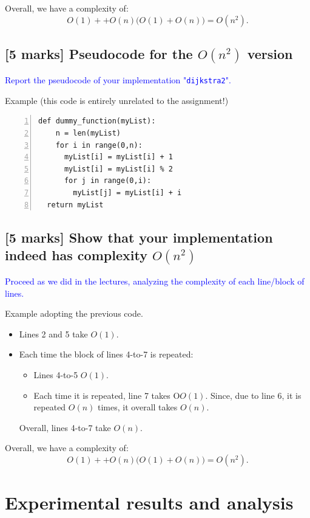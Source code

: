 \documentclass[a4paper]{article}
\numberwithin{equation}{section} %
\begin{document}
Overall, we have a complexity of:
$$
  O(1) + + O(n) \big( O(1) + O(n)\big) = O(n^2).
$$

\subsection{[5 marks] Pseudocode for the $O(n^2)$ version}

\textcolor{blue}{
  Report the pseudocode of your implementation "{\tt dijkstra2}".
}

Example (this code is entirely unrelated to the assignment!)

\begin{Verbatim}[numbers=left]
  def dummy_function(myList):
    n = len(myList)
    for i in range(0,n):
      myList[i] = myList[i] + 1
      myList[i] = myList[i] % 2
      for j in range(0,i):
        myList[j] = myList[i] + i
  return myList
\end{Verbatim}
  


\subsection{[5 marks] Show that your implementation indeed has complexity $O(n^2)$}

\textcolor{blue}{
  Proceed as we did in the lectures, analyzing the complexity of each line/block of lines.
}

Example adopting the previous code.

\begin{itemize}
  \item Lines 2 and 5 take $O(1)$.
  \item Each time the block of lines 4-to-7 is repeated:
  \begin{itemize}
    \item Lines 4-to-5  $O(1)$.
    \item Each time it is repeated, line 7 takes O$O(1)$. Since, due to line 6, it is repeated $O(n)$ times, it overall takes $O(n)$.
  \end{itemize}
  Overall, lines 4-to-7 take $O(n)$.
\end{itemize}

Overall, we have a complexity of:
$$
  O(1) + + O(n) \big( O(1) + O(n)\big) = O(n^2).
$$


\section{Experimental results and analysis}
\end{document}
